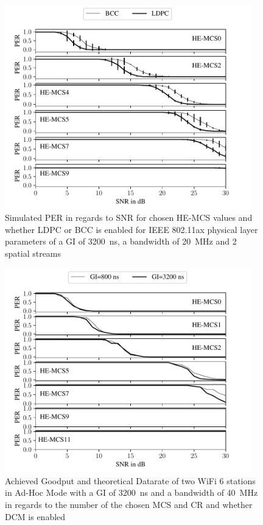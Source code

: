 \begin{figure}%
	\centering
	\includegraphics[width=0.95\textwidth]{figures/LDPC_PER_to_SNR.pdf}
	\caption{Simulated \ac{PER} in regards to \ac{SNR} for chosen HE-\ac{MCS} values and whether \ac{LDPC} or \ac{BCC} is enabled for IEEE 802.11ax physical layer parameters of a \ac{GI} of \SI{3200}{\nano\second}, a bandwidth of \SI{20}{\mega\hertz} and 2 spatial streams}%
	\label{fig:PER_SNR_LDPC}%
\end{figure}

\begin{figure}%
	\centering
	\includegraphics[width=0.95\textwidth]{figures/GI_PER_to_SNR.pdf}
	\caption{Achieved Goodput and theoretical Datarate of two WiFi 6 stations in Ad-Hoc Mode with a \ac{GI} of \SI{3200}{\nano\second} and a bandwidth of \SI{40}{\mega\hertz} in regards to the number of the chosen \ac{MCS} and \ac{CR} and whether \ac{DCM} is enabled}%
	\label{fig:PER_SNR_GI}%
\end{figure}

